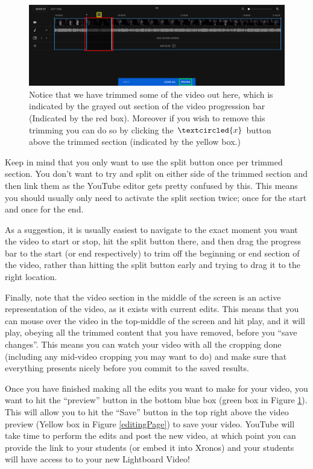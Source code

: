 \documentclass{article}
\begin{document}
        \begin{figure}[h]
            \includegraphics[width=\textwidth]{postTrim.png}
            \caption{Notice that we have trimmed some of the video out here, which is indicated by the grayed out section of the video progression bar (Indicated by the red box). Moreover if you wish to remove this trimming you can do so by clicking the $\textcircled{x}$ button above the trimmed section (indicated by the yellow box.)}
            \label{postTrim}
        \end{figure}
        
        Keep in mind that you only want to use the split button once per trimmed section. You don't want to try and split on either side of the trimmed section and then link them as the YouTube editor gets pretty confused by this. This means you should usually only need to activate the split section twice; once for the start and once for the end. 
        
        As a suggestion, it is usually easiest to navigate to the exact moment you want the video to start or stop, hit the split button there, and then drag the progress bar to the start (or end respectively) to trim off the beginning or end section of the video, rather than hitting the split button early and trying to drag it to the right location.
        
        Finally, note that the video section in the middle of the screen is an active representation of the video, as it exists with current edits. This means that you can mouse over the video in the top-middle of the screen and hit play, and it will play, obeying all the trimmed content that you have removed, before you ``save changes''. This means you can watch your video with all the cropping done (including any mid-video cropping you may want to do) and make sure that everything presents nicely before you commit to the saved results.
        
        Once you have finished making all the edits you want to make for your video, you want to hit the ``preview'' button in the bottom blue box (green box in Figure \ref{postTrim}). This will allow you to hit the ``Save'' button in the top right above the video preview (Yellow box in Figure \ref{editingPage}) to save your video. YouTube will take time to perform the edits and post the new video, at which point you can provide the link to your students (or embed it into Xronos) and your students will have access to to your new Lightboard Video!
        
\end{document}
